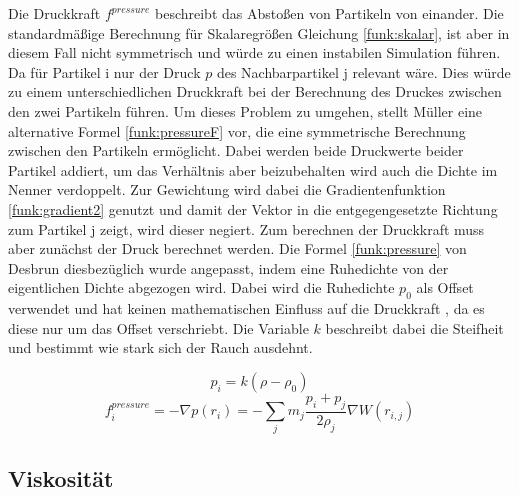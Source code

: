 \documentclass[intern,palatino]{cgBA}
\begin{document}
Die Druckkraft $f^{pressure}$ beschreibt das Abstoßen von Partikeln von einander. Die standardmäßige Berechnung für Skalaregrößen Gleichung \ref{funk:skalar}, ist aber in diesem Fall nicht symmetrisch und würde zu einen instabilen Simulation führen. Da für Partikel i nur der Druck $p$ des Nachbarpartikel j relevant wäre. Dies würde zu einem unterschiedlichen Druckkraft bei der Berechnung des Druckes zwischen den zwei Partikeln führen. Um dieses Problem zu umgehen, stellt Müller \cite{muller2003particle} eine alternative Formel \ref{funk:pressureF} vor, die eine symmetrische Berechnung zwischen den Partikeln ermöglicht. Dabei werden beide Druckwerte beider Partikel addiert, um das Verhältnis aber beizubehalten wird auch die Dichte im Nenner verdoppelt. Zur Gewichtung wird dabei die Gradientenfunktion \ref{funk:gradient2} genutzt und damit der Vektor in die entgegengesetzte Richtung zum Partikel j zeigt, wird dieser negiert.
\newline
Zum berechnen der Druckkraft muss aber zunächst der Druck berechnet werden. Die Formel \ref{funk:pressure} von Desbrun \cite{desbrun1996smoothed} diesbezüglich wurde angepasst, indem eine Ruhedichte von der eigentlichen Dichte abgezogen wird. Dabei wird die Ruhedichte $p_0$ als Offset verwendet und hat keinen mathematischen Einfluss auf die Druckkraft \cite{muller2003particle}, da es diese nur um das Offset verschriebt. Die Variable $k$ beschreibt dabei die Steifheit und bestimmt wie stark sich der Rauch ausdehnt.

\begin{equation}\label{funk:pressure}
p_i = k(\rho - \rho_0)
\end{equation}
\begin{equation}\label{funk:pressureF}
f^{pressure}_i = - \nabla p(r_i) = - \sum_j m_j \frac{p_i+p_j}{2\rho_j} \nabla W(r_{i,j})
\end{equation}


\subsection{Viskosität}\label{visc}
\end{document}
